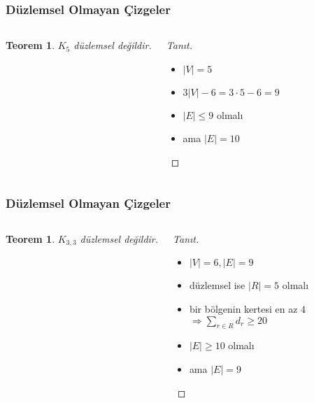\documentclass[dvipsnames]{beamer}
\theoremstyle{definition}
\theoremstyle{example}
\theoremstyle{plain}
\newtheorem{teorem}[theorem]{Teorem}
\begin{document}
\begin{frame}
  \frametitle{Düzlemsel Olmayan Çizgeler}

  \begin{columns}
    \begin{teorem}
      $K_5$ düzlemsel değildir.

      \medskip
      \begin{center}
      \end{center}
    \end{teorem}

    \pause
    \begin{proof}[Tanıt]
      \begin{itemize}
        \item $|V| = 5$

        \pause
        \item $3 |V| - 6 = 3 \cdot 5 - 6 = 9$

        \pause
        \item $|E| \leq 9$ olmalı\\

        \pause
        \item ama $|E| = 10$
      \end{itemize}
    \end{proof}
  \end{columns}
\end{frame}

\begin{frame}
  \frametitle{Düzlemsel Olmayan Çizgeler}

  \begin{columns}
    \begin{teorem}
      $K_{3,3}$ düzlemsel değildir.

      \medskip
      \begin{center}
      \end{center}
    \end{teorem}

    \pause
    \begin{proof}[Tanıt]
      \begin{itemize}
        \item $|V| = 6, |E| = 9$

        \pause
        \item düzlemsel ise $|R| = 5$ olmalı

        \pause
        \item bir bölgenin kertesi en az $4$\\
          $\Rightarrow \sum_{r \in R} d_r \geq 20$

        \pause
        \item $|E| \geq 10$ olmalı\\

        \pause
        \item ama $|E| = 9$
      \end{itemize}
    \end{proof}
  \end{columns}
\end{frame}
\end{document}
